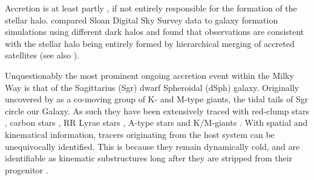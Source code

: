 \documentclass[preprint2]{aastex}
\begin{document}
	
 Accretion is at least partly \citep[][e.g.]{Starkenburg;et-al_2009}, if not entirely responsible for the formation of the stellar halo. \citet{Bell;et-al_2008} compared Sloan Digital Sky Survey \citep[hereafter SDSS]{York;et-al_2000} data to galaxy formation simulations using different dark halos and found that observations are consistent with the stellar halo being entirely formed by hierarchical merging of accreted satellites (see also \citet{Xue;et-al_2011}).
	
Unquestionably the most prominent ongoing accretion event within the Milky Way is that of the Sagittarius (Sgr) dwarf Spheroidal (dSph) galaxy. Originally uncovered by \citet{Ibata;et-al_1994} as a co-moving group of K- and M-type giants, the tidal tails of Sgr circle our Galaxy. As such they have been extensively traced with red-clump stars \citep{Majewski;et-al_1999}, carbon stars \citep{Totten;Irwin_1998, Ibata;et-al_2001}, RR Lyrae stars \citep{Ivezic;et-al_2000, Vivas;et-al_2005, Keller;et-al_2008, Watkins;et-al_2009, Prior;et-al_2009b}, A-type stars \citep{Newberg;et-al_2003} and K/M-giants \citep{Majewski;et-al_2003,  Yanny;et-al_2009, Keller;Yong;Da_Costa_2010}. With spatial and kinematical information, tracers originating from the host system can be unequivocally identified. This is because they remain dynamically cold, and are identifiable as kinematic substructures long after they are stripped from their progenitor \citep[for example][]{Ibata;Lewis_1998, Helmi;White_1999}. 
	
\end{document}
